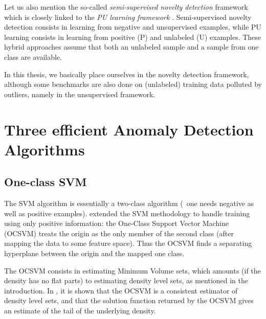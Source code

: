 Let us also mention the so-called \emph{semi-supervised novelty detection} \citep{Blanchard2010, Smola2009} framework which is closely linked to the \emph{PU learning framework} \citep{Denis2005, Liu2002, Mordelet2014, duPlessis2015}. 
Semi-supervised novelty detection consists in learning from negative and unsupervised examples, while PU learning consists in learning from positive (P) and unlabeled (U) examples. These hybrid approaches assume that both an unlabeled sample and a sample from one class are available.

In this thesis, we basically place ourselves in the novelty detection framework, although some benchmarks are also done on (unlabeled) training data polluted by outliers, namely in the unsupervised framework.

\section{Three efficient Anomaly Detection Algorithms}
\label{sec:AD_sklearn}


\subsection{One-class SVM}
\label{back:ocsvm}
The SVM algorithm is essentially a two-class algorithm (\ie~one needs negative as well as positive examples).
\cite{Scholkopf2001} extended the SVM methodology to handle training using only positive information:
the One-Class Support Vector Machine (OCSVM) treats the origin as the only member of the second class (after mapping the data to some feature space). Thus the OCSVM finds a separating hyperplane between the origin and the mapped one class. %

The OCSVM consists in estimating Minimum Volume sets, which amounts (if the density has no flat parts) to estimating density level sets, as mentioned in the introduction.
In \cite{VertVert}, it is shown that the OCSVM is a consistent estimator of density level sets, and that the solution function returned by the OCSVM gives an estimate of the tail of the underlying density.

